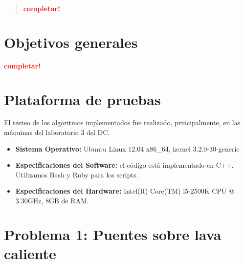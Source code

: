 \documentclass[a4paper]{article}
\begin{document}
\thispagestyle{empty}

\maketitle
\newpage

\thispagestyle{empty}
\vfill
\begin{abstract}
    \textcolor{red}{\textbf{completar!}}
\end{abstract}

\thispagestyle{empty}
\vspace{3cm}
\tableofcontents
\newpage


\newpage

\section{Objetivos generales}
  \textcolor{red}{\textbf{completar!}}

\newpage

\section{Plataforma de pruebas}
El testeo de los algoritmos implementados fue realizado, principalmente, en las máquinas del laboratorio 3 del DC. \newline
\begin{itemize}
  \item \textbf{Sistema Operativo:} Ubuntu Linux 12.04 x86_64, kernel 3.2.0-30-generic
  
  \item \textbf{Especificaciones del Software:} el código está implementado en C++. Utilizamos Bash y Ruby para los scripts.
  
  \item \textbf{Especificaciones del Hardware:} Intel(R) Core(TM) i5-2500K CPU @ 3.30GHz, 8GB de RAM.
\end{itemize}

\newpage

\section{Problema 1: Puentes sobre lava caliente}

\end{document}
